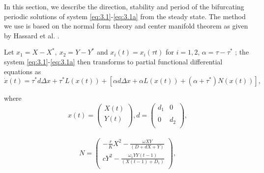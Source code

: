 \documentclass[10pt]{amsart}
\theoremstyle{definition}
\begin{document}
In this section, we describe the direction, stability and period of the
bifurcating periodic solutions of system \eqref{eq:3.1}-\eqref{eq:3.1a} from the steady state.
The method we use is based on the normal form theory and center
manifold theorem as given by Hassard et al. \cite{BD81}.

Let $x_{1}=X-X^*,~ x_{2}=Y-Y^*$ and $ {x{_{i}}}(t)=x_{i}(\tau t)$ for $i=1, 2$, $\alpha=\tau-\tau^*$ ; the system \eqref{eq:3.1}-\eqref{eq:3.1a} then transforms to partial functional differential equations as
\begin{equation}\label{eq:4.1}
{\dot x}(t)=\tau^* d \Delta x +\tau^* L(x(t))+[\alpha d \Delta x + \alpha L(x(t))+(\alpha+\tau^*)N(x(t))],
\end{equation}

where
$$x(t)=\left(
            \begin{array}{c}
             {\displaystyle{X(t)}}\\
             {\displaystyle{Y(t)}}\\
            \end{array}
     \right),
		d=\left(
            \begin{array}{cc}
             {\displaystyle{d_1}} & {\displaystyle{0}}\\ \\
             {\displaystyle{0}} & {\displaystyle{d_2}}\\
            \end{array}
     \right),$$
		\\
		$$N=\left(
            \begin{array}{c}
             {\displaystyle{-\frac{r}{K}X^2-\frac{\omega XY}{(D+dX+Y)}}}\\
             {\displaystyle{cY^2-\frac{ \omega_1 YY(t-1)}{(X(t-1)+D_1)}}}\\
            \end{array}
						\right),$$
						
					
						
\end{document}
